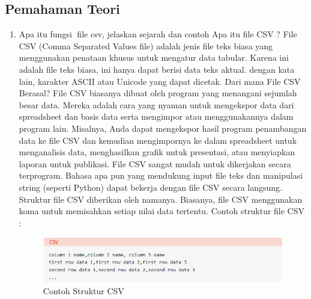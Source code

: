 \subsection{Pemahaman Teori}
\begin {enumerate}
\item Apa itu fungsi file csv, jelaskan sejarah dan contoh Apa itu file CSV ?\newline
File CSV (Comma Separated Values file) adalah jenis file teks biasa yang menggunakan penataan khusus untuk mengatur data 		tabular. Karena ini adalah file teks biasa, ini hanya dapat berisi data teks aktual. dengan kata lain, karakter ASCII atau Unicode 	yang dapat dicetak.\newline
Dari mana File CSV Berasal?\newline
File CSV biasanya dibuat oleh program yang menangani sejumlah besar data. Mereka adalah cara yang nyaman untuk mengekspor data dari spreadsheet dan basis data serta mengimpor atau menggunakannya dalam program lain. Misalnya, Anda dapat mengekspor hasil program penambangan data ke file CSV dan kemudian mengimpornya ke dalam spreadsheet untuk menganalisis data, menghasilkan grafik untuk presentasi, atau menyiapkan laporan untuk publikasi.
File CSV sangat mudah untuk dikerjakan secara terprogram. Bahasa apa pun yang mendukung input file teks dan manipulasi string (seperti Python) dapat bekerja dengan file CSV secara langsung.
Struktur file CSV diberikan oleh namanya. Biasanya, file CSV menggunakan koma untuk memisahkan setiap nilai data tertentu. 
Contoh struktur file CSV :

\begin{figure}[h]
\centering
\includegraphics[scale=0.5]{figures/4/1174002/struktur_csv.png}
\caption{Contoh Struktur CSV}
\label{fig:csv}
\end{figure}


\end{enumerate}
